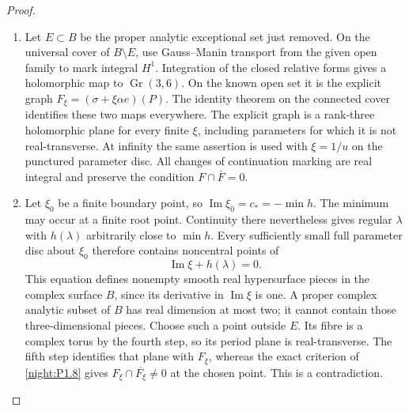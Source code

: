 \documentclass[11pt,a4paper]{article}
\theoremstyle{definition}
\begin{document}
\begin{proof}
\begin{enumerate}[label=\arabic*.]
Relative exterior differentiation defines an
$\mathcal O_B$-linear map
$\mathcal E\to q_*\Omega^2_{W/B}$.  It vanishes on the known
torus open set.  The target is torsion-free, since it is the
proper direct image of a vector bundle under a submersion.
The identity theorem therefore makes this map zero.  Each
remaining compact connected fibre has three everywhere
independent closed holomorphic one-forms.  Their dual vector
fields commute and are complete by compactness.  Their flows
give a transitive holomorphic $\mathbb C^3$-action: every orbit
is open and the fibre is connected.  Its stabilizer $\Gamma$
is discrete, and compactness of $\mathbb C^3/\Gamma$ makes
$\Gamma$ a full real lattice.  This is the actual complex-torus
structure on each such fibre.

\item Let $E\subset B$ be the proper analytic exceptional set just
removed.  On the universal cover of $B\setminus E$, use
Gauss--Manin transport from the given open family to mark
integral $H^1$.  Integration of the closed relative forms
gives a holomorphic map to $\operatorname{Gr}(3,6)$.  On the
known open set it is the explicit graph
$F_\xi=(\sigma+\xi\alpha e)(P)$.  The identity theorem on the
connected cover identifies these two maps everywhere.
The explicit graph is a rank-three holomorphic plane for
every finite $\xi$, including parameters for which it is not
real-transverse.  At infinity the same assertion is used with
$\xi=1/u$ on the punctured parameter disc.  All changes of
continuation marking are real integral and preserve the
condition $F\cap\bar F=0$.

\item Let $\xi_0$ be a finite boundary point, so
$\operatorname{Im}\xi_0=c_*=-\min h$.
The minimum may occur at a finite root point.  Continuity
there nevertheless gives regular $\lambda$ with $h(\lambda)$
arbitrarily close to $\min h$.  Every sufficiently small full
parameter disc about $\xi_0$ therefore contains noncentral
points of
\[
 \operatorname{Im}\xi+h(\lambda)=0.
\]
This equation defines nonempty smooth real hypersurface
pieces in the complex surface $B$, since its derivative in
$\operatorname{Im}\xi$ is one.  A proper complex analytic
subset of $B$ has real dimension at most two; it cannot
contain those three-dimensional pieces.  Choose such a
point outside $E$.  Its fibre is a complex torus by the fourth
step, so its period plane is real-transverse.  The fifth step
identifies that plane with $F_\xi$, whereas the exact criterion
of \cref{night:P1.8} gives
$F_\xi\cap\overline{F_\xi}\ne0$ at the chosen point.
This is a contradiction.


\end{enumerate}
\end{proof}
\end{document}

